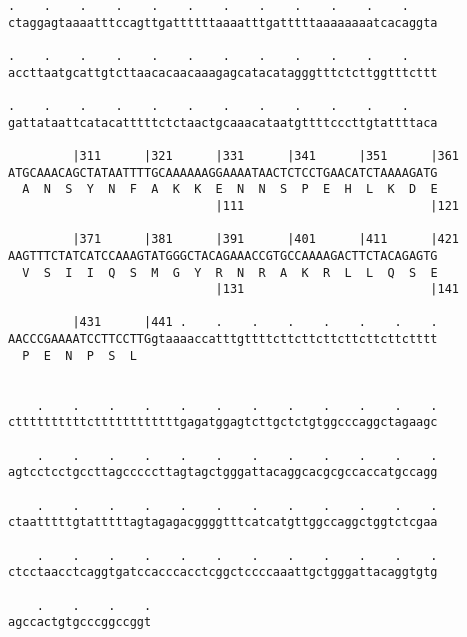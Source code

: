 \documentclass{article}
\begin{document}
\begin{Verbatim}
.    .    .    .    .    .    .    .    .    .    .    .    
ctaggagtaaaatttccagttgattttttaaaatttgatttttaaaaaaaatcacaggta
                                                            
.    .    .    .    .    .    .    .    .    .    .    .    
accttaatgcattgtcttaacacaacaaagagcatacatagggtttctcttggtttcttt
                                                            
.    .    .    .    .    .    .    .    .    .    .    .    
gattataattcatacatttttctctaactgcaaacataatgttttcccttgtattttaca
                                                            
         |311      |321      |331      |341      |351      |361
ATGCAAACAGCTATAATTTTGCAAAAAAGGAAAATAACTCTCCTGAACATCTAAAAGATG
  A  N  S  Y  N  F  A  K  K  E  N  N  S  P  E  H  L  K  D  E
                             |111                          |121
  
         |371      |381      |391      |401      |411      |421
AAGTTTCTATCATCCAAAGTATGGGCTACAGAAACCGTGCCAAAAGACTTCTACAGAGTG
  V  S  I  I  Q  S  M  G  Y  R  N  R  A  K  R  L  L  Q  S  E
                             |131                          |141
  
         |431      |441 .    .    .    .    .    .    .    .
AACCCGAAAATCCTTCCTTGgtaaaaccatttgttttcttcttcttcttcttcttctttt
  P  E  N  P  S  L                                          
                                                            
  
    .    .    .    .    .    .    .    .    .    .    .    .
cttttttttttcttttttttttttgagatggagtcttgctctgtggcccaggctagaagc
                                                            
    .    .    .    .    .    .    .    .    .    .    .    .
agtcctcctgccttagcccccttagtagctgggattacaggcacgcgccaccatgccagg
                                                            
    .    .    .    .    .    .    .    .    .    .    .    .
ctaatttttgtatttttagtagagacggggtttcatcatgttggccaggctggtctcgaa
                                                            
    .    .    .    .    .    .    .    .    .    .    .    .
ctcctaacctcaggtgatccacccacctcggctccccaaattgctgggattacaggtgtg
                                                            
    .    .    .    .
agccactgtgcccggccggt
                    
                    
 

\end{Verbatim}
\end{document}

